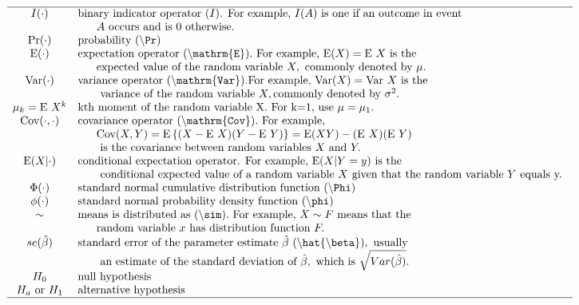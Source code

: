 \documentclass[]{book}
\theoremstyle{definition}
\theoremstyle{definition}
\theoremstyle{definition}
\theoremstyle{remark}
\begin{document}
\[
\begin{array}{cl}  \hline
I(\cdot) & \text{binary indicator operator (}I\text{). For example, }I(A) \text{ is one if an outcome in event} \\
& \ \ \ \ \  A \text{ occurs and is 0 otherwise.} \\
\Pr(\cdot) & \text{probability }(\backslash{\tt{Pr}}) \\
\mathrm{E}(\cdot)  & {\text{expectation operator }} (\backslash{\tt{mathrm\{E\}}}). {\text{ For example, }} \mathrm{E}(X)=\mathrm{E}~X {\text{ is the }} \\
& \ \ \ \ \ {\text{expected value of the random variable }}X,{\text{ commonly denoted by }}\mu. \\
\mathrm{Var}(\cdot)  & \text{variance operator }(\backslash{\tt{mathrm\{Var\}}}). \text{For example, } \mathrm{Var}(X)=\mathrm{Var}~X\text{ is the} \\
& \ \ \ \ \  \text{ variance of the random variable } X, \text{commonly denoted by } \sigma^2. \\
\mu_k = \mathrm{E}~X^k & \text{kth moment of the random variable X. For k=1, use }\mu = \mu_1. \\
\mathrm{Cov}(\cdot,\cdot)  & \text{covariance operator } (\backslash{\tt{mathrm\{Cov\}}}).\text{ For example, } \\
& \ \ \ \ \ \mathrm{Cov}(X,Y)=\mathrm{E}\left\{(X -\mathrm{E}~X)(Y-\mathrm{E}~Y)\right\}  =\mathrm{E}(XY) -(\mathrm{E}~X)(\mathrm{E}~Y)\\
& \ \ \ \ \  \text{ is the covariance between random variables }X\text{ and }Y. \\
\mathrm{E}(X | \cdot)  & \text{conditional expectation operator. For example, }\mathrm{E}(X |Y=y) \text{ is the}\\
& \ \ \ \ \   \text{ conditional expected value of a random variable }X\text{ given that the random variable }Y\text{ equals y. }\\
\Phi(\cdot) & \text{standard normal cumulative distribution function }(\backslash{\tt{Phi}})\\
\phi(\cdot) & \text{standard normal probability density function }(\backslash{\tt{phi}})\\
\sim & \text{means is distributed as }(\backslash{\tt{sim}}). \text{ For example, }X\sim F \text{ means that the } \\
& \ \ \ \ \  \text{random variable } x \text{ has distribution function }F. \\
se(\hat{\beta}) & \text{standard error of the parameter estimate }\hat{\beta} ~ (\backslash{\tt{hat\{}}\backslash{\tt{beta\}}}), \text{ usually }\\
& \ \ \ \ \  \text{ an estimate of the standard deviation of }\hat{\beta},\text{ which is }\sqrt{Var(\hat{\beta})}. \\
H_0 &  \text{null hypothesis} \\
H_a \text{ or }H_1 & \text{alternative hypothesis} \\
\hline
\end{array}
\]
\end{document}
